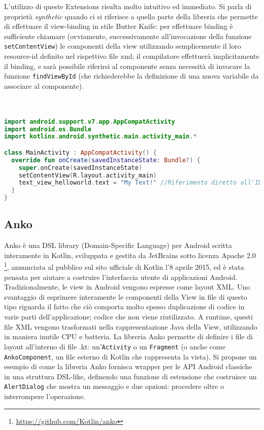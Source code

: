 L'utilizzo di queste Extensions risulta molto intuitivo ed immediato. Si parla di proprietà {\em synthetic} quando ci si riferisce a quella parte della libreria che permette di effettuare il view-binding in stile Butter Knife: per effettuare binding è sufficiente chiamare (ovviamente, successivamente all'invocazione della funzione \texttt{setContentView}) le componenti della view utilizzando semplicemente il loro resource-id definito nel rispettivo file xml; il compilatore effettuerà implicitamente il binding, e sarà possibile riferirsi al componente senza necessità di invocare la funzione \texttt{findViewById} (che richiederebbe la definizione di una nuova variabile da associare al componente).\\
\\
\\

\begin{lstlisting}[caption={Utilizzo delle proprietà synthetic di KAE}, captionpos=b, label={lst:exAmpleKAE}, language=Kotlin]
import android.support.v7.app.AppCompatActivity
import android.os.Bundle
import kotlinx.android.synthetic.main.activity_main.*

class MainActivity : AppCompatActivity() {
  override fun onCreate(savedInstanceState: Bundle?) {
    super.onCreate(savedInstanceState)
    setContentView(R.layout.activity_main)
    text_view_helloworld.text = "My Text!" //Riferimento diretto all'ID xml
  }
}
\end{lstlisting}

\subsection{Anko}
Anko è una DSL library (Domain-Specific Language) per Android scritta interamente in Kotlin, sviluppata e gestita da JetBrains sotto licenza Apache 2.0 \footnote{\url{https://github.com/Kotlin/anko}}, annunciata al pubblico sul sito ufficiale di Kotlin l'8 aprile 2015, ed è stata pensata per aiutare a costruire l'interfaccia utente di applicazioni Android.\\
Tradizionalmente, le view in Android vengono espresse come layout XML. Uno svantaggio di esprimere interamente le componenti della View in file di questo tipo riguarda il fatto che ciò comporta molto spesso duplicazione di codice in varie parti dell'applicazione; codice che non viene riutilizzato. A runtime, questi file XML vengono trasformati nella rappresentazione Java della View, utilizzando in maniera inutile CPU e batteria. La libreria Anko permette di definire i file di layout all'interno di file .kt: un'\texttt{Activity} o un \texttt{Fragment} (o anche come \texttt{AnkoComponent}, un file esterno di Kotlin che rappresenta la vista). Si propone un esempio di come la libreria Anko fornisca wrapper per le API Android classiche in una struttura DSL-like, definendo una funzione di estensione che costruisce un \texttt{AlertDialog} che mostra un messaggio e due opzioni: procedere oltre o interrompere l'operazione.\\

